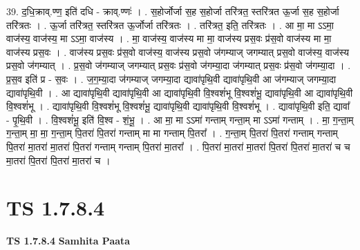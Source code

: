 \documentclass[17pt]{extarticle}
\begin{document}
39. द॒धि॒क्राव्.ण्ण॒ इति॑ दधि - क्राव्.ण्णः॑ । . स॒होर्जोर्जा स॒ह स॒होर्जा तरि॑त्रत॒ स्तरि॑त्रत ऊ॒र्जा स॒ह स॒होर्जा तरि॑त्रतः । . ऊ॒र्जा तरि॑त्रत॒ स्तरि॑त्रत ऊ॒र्जोर्जा तरि॑त्रतः । . तरि॑त्रत॒ इति॒ तरि॑त्रतः । . आ मा॒ मा ऽऽमा॒ वाज॑स्य॒ वाज॑स्य॒ मा ऽऽमा॒ वाज॑स्य । . मा॒ वाज॑स्य॒ वाज॑स्य मा मा॒ वाज॑स्य प्रस॒वः प्र॑स॒वो वाज॑स्य मा मा॒ वाज॑स्य प्रस॒वः । . वाज॑स्य प्रस॒वः प्र॑स॒वो वाज॑स्य॒ वाज॑स्य प्रस॒वो ज॑गम्याज् जगम्यात् प्रस॒वो वाज॑स्य॒ वाज॑स्य प्रस॒वो ज॑गम्यात् । . प्र॒स॒वो ज॑गम्याज् जगम्यात् प्रस॒वः प्र॑स॒वो ज॑गम्या॒दा ज॑गम्यात् प्रस॒वः प्र॑स॒वो ज॑गम्या॒दा । . प्र॒स॒व इति॑ प्र - स॒वः । . ज॒ग॒म्या॒दा ज॑गम्याज् जगम्या॒दा द्यावा॑पृथि॒वी द्यावा॑पृथि॒वी आ ज॑गम्याज् जगम्या॒दा द्यावा॑पृथि॒वी । . आ द्यावा॑पृथि॒वी द्यावा॑पृथि॒वी आ द्यावा॑पृथि॒वी वि॒श्वशं॑भू वि॒श्वशं॑भू॒ द्यावा॑पृथि॒वी आ द्यावा॑पृथि॒वी वि॒श्वशं॑भू । . द्यावा॑पृथि॒वी वि॒श्वशं॑भू वि॒श्वशं॑भू॒ द्यावा॑पृथि॒वी द्यावा॑पृथि॒वी वि॒श्वशं॑भू । . द्यावा॑पृथि॒वी इति॒ द्यावा᳚ - पृ॒थि॒वी । . वि॒श्वशं॑भू॒ इति॑ वि॒श्व - शं॒भू॒ । . आ मा॒ मा ऽऽमा॑ गन्ताम् गन्ता॒म् मा ऽऽमा॑ गन्ताम् । . मा॒ ग॒न्ता॒म् ग॒न्ता॒म् मा॒ मा॒ ग॒न्ता॒म् पि॒तरा॑ पि॒तरा॑ गन्ताम् मा मा गन्ताम् पि॒तरा᳚ । . ग॒न्ता॒म् पि॒तरा॑ पि॒तरा॑ गन्ताम् गन्ताम् पि॒तरा॑ मा॒तरा॑ मा॒तरा॑ पि॒तरा॑ गन्ताम् गन्ताम् पि॒तरा॑ मा॒तरा᳚ । . पि॒तरा॑ मा॒तरा॑ मा॒तरा॑ पि॒तरा॑ पि॒तरा॑ मा॒तरा॑ च च मा॒तरा॑ पि॒तरा॑ पि॒तरा॑ मा॒तरा॑ च । \newline
\pagebreak
{}

\section{ TS 1.7.8.4 }

\textbf{TS 1.7.8.4 } \newline
\textbf{Samhita Paata} \newline
\end{document}
